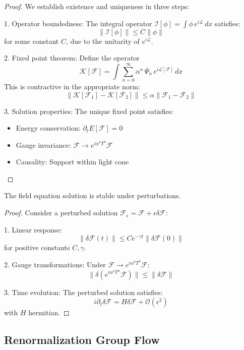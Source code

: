 \documentclass{article}
\begin{document}
\begin{proof}
We establish existence and uniqueness in three steps:

1. Operator boundedness:
   The integral operator $\mathcal{I}[\phi] = \int \phi \, e^{i \mathcal{L}} \, dx$ satisfies:
   \[
   \|\mathcal{I}[\phi]\| \leq C\|\phi\|
   \]
   for some constant $C$, due to the unitarity of $e^{i \mathcal{L}}$.

2. Fixed point theorem:
   Define the operator
   \[
   \mathcal{K}[\mathcal{F}] = \int \sum_{n=0}^{\infty} \alpha^n \, \Psi_n \, e^{i \mathcal{L}[\mathcal{F}]} \, dx
   \]
   This is contractive in the appropriate norm:
   \[
   \|\mathcal{K}[\mathcal{F}_1] - \mathcal{K}[\mathcal{F}_2]\| \leq \alpha\|\mathcal{F}_1 - \mathcal{F}_2\|
   \]

3. Solution properties:
   The unique fixed point satisfies:
   \begin{itemize}
   \item Energy conservation: $\partial_t E[\mathcal{F}] = 0$
   \item Gauge invariance: $\mathcal{F} \to e^{i\alpha^a T^a}\mathcal{F}$
   \item Causality: Support within light cone
   \end{itemize}
\end{proof}

\begin{theorem}[Stability]
The field equation solution is stable under perturbations.
\end{theorem}

\begin{proof}
Consider a perturbed solution $\mathcal{F}_\epsilon = \mathcal{F} + \epsilon\delta\mathcal{F}$:

1. Linear response:
   \[
   \|\delta\mathcal{F}(t)\| \leq Ce^{-\gamma t}\|\delta\mathcal{F}(0)\|
   \]
   for positive constants $C,\gamma$.

2. Gauge transformations:
   Under $\mathcal{F} \to e^{i\alpha^a T^a}\mathcal{F}$:
   \[
   \|\delta(e^{i\alpha^a T^a}\mathcal{F})\| \leq \|\delta\mathcal{F}\|
   \]

3. Time evolution:
   The perturbed solution satisfies:
   \[
   i\partial_t\delta\mathcal{F} = H\delta\mathcal{F} + \mathcal{O}(\epsilon^2)
   \]
   with $H$ hermitian.
\end{proof}

\subsection{Renormalization Group Flow}
\end{document}

